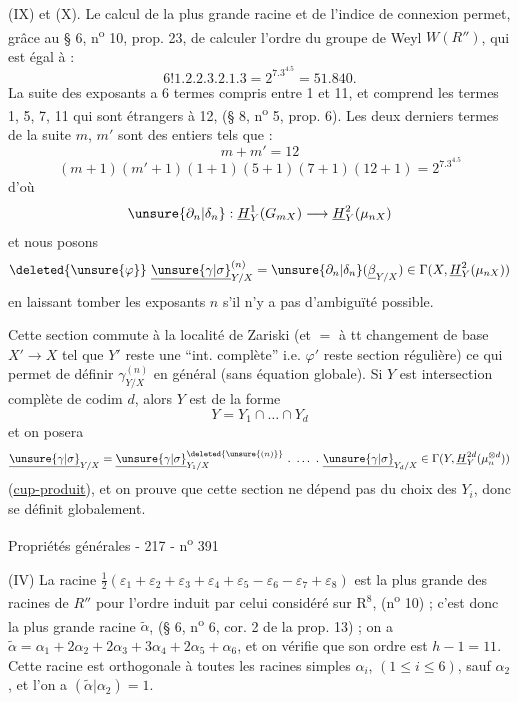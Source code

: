 (IX) et (X). Le calcul de la plus grande racine et de l'indice de connexion permet, grâce au § 6, n\textsuperscript{o} 10, prop. 23, de calculer l'ordre du groupe de Weyl $W(R'')$, qui est égal à :
\[
6!1.2.2.3.2.1.3=2^7.3^4.5=51.840.
\]
La suite des exposants a 6 termes compris entre 1 et 11, et comprend les termes 1, 5, 7, 11 qui sont étrangers à 12, (§ 8, n\textsuperscript{o} 5, prop. 6). Les deux derniers termes de la suite $m$, $m'$ sont des entiers tels que :
\[
m+m'=12
\]
\[
(m+1)(m'+1)(1+1)(5+1)(7+1)(12+1)=2^7.3^4.5
\]
d'où
\[
\unsure{\partial_n|\delta_n}:\underline H^1_Y(G_{mX})\longrightarrow\underline H^2_Y(\mu_{nX})
\]
et nous posons
\[
\deleted{\unsure{\varphi}}\ \underline{\unsure{\gamma|\sigma}}_{Y/X}^{(n)}=\unsure{\partial_n|\delta_n}(\underline\beta_{Y/X})\in\Gamma(X,\underline H^2_Y(\mu_{nX}))
\]
en laissant tomber les exposants $n$ s'il n'y a pas d'ambiguïté possible.

 Cette section  commute à la localité de Zariski (et $=$ à tt changement de base $X'\to X$ tel que $Y'$ reste une ``int. complète'' i.e. $\varphi'$ reste section régulière) ce qui permet de définir $\gamma_{Y/X}^{(n)}$ en général (sans équation globale). Si  $Y$ est intersection complète de codim $d$, alors  $Y$ est de la forme
\[
Y=Y_1\cap\ldots\cap Y_d
\]
et on posera
\[
\underline{\unsure{\gamma|\sigma}}_{Y/X}
=\underline{\unsure{\gamma|\sigma}}_{Y_1/X}^{\deleted{\unsure{(n)}}}\ .\ \ldots\ .\ \underline{\unsure{\gamma|\sigma}}_{Y_d/X}
\in\Gamma(Y,\underline H^{2d}_Y(\mu_n^{\otimes d}))
\]
(\uline{cup-produit}), et on prouve que cette section ne dépend pas du choix des $Y_i$, donc se définit globalement.

Propriétés générales
- 217 - \hfill n\textsuperscript{o} 391

(IV) La racine $\frac12(\varepsilon_1+\varepsilon_2+\varepsilon_3+\varepsilon_4+\varepsilon_5-\varepsilon_6-\varepsilon_7+\varepsilon_8)$ est la plus grande des racines de $R''$ pour l'ordre induit par celui considéré sur $\mathrm R^8$, (n\textsuperscript{o} 10) ; c'est donc la plus grande racine $\widetilde\alpha$, (§ 6, n\textsuperscript{o} 6, cor. 2 de la prop. 13) ; on a $\widetilde\alpha=\alpha_1+2\alpha_2+2\alpha_3+3\alpha_4+2\alpha_5+\alpha_6$, et on vérifie que son ordre est $h-1=11$. Cette racine est orthogonale à toutes les racines simples $\alpha_i$, $(1\leq i\leq6)$, sauf $\alpha_2$, et l'on a $(\widetilde\alpha|\alpha_2)=1$.

